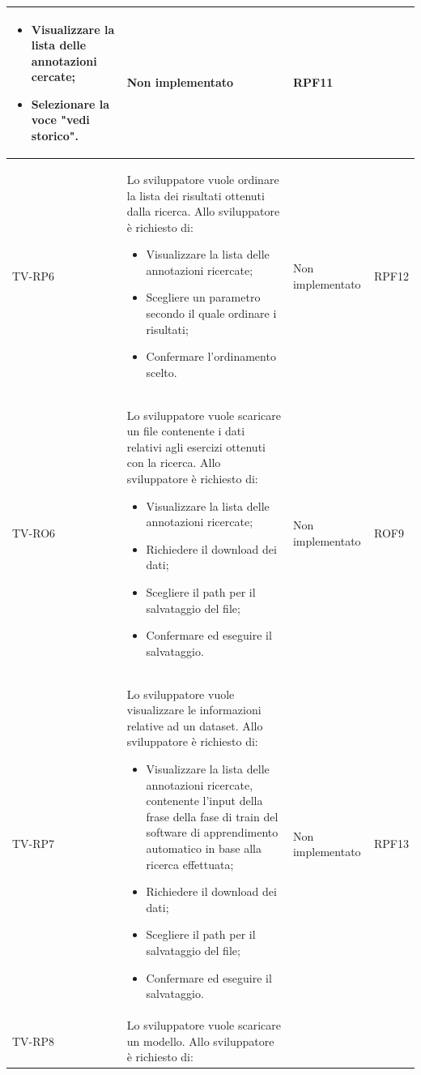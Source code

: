 \begin{longtable}{|>{\centering\arraybackslash}m{1.6cm}|>{\centering\arraybackslash}m{6.41cm}|>{\centering\arraybackslash}m{3.1cm} | >{\centering\arraybackslash}m{2.6cm}|}
		\begin{itemize}
			\item Visualizzare la lista delle annotazioni cercate;
			\item Selezionare la voce "vedi storico".
		\end{itemize}& Non implementato  & RPF11 \\ \hline
		TV-RP6 & Lo sviluppatore vuole ordinare la lista dei risultati ottenuti dalla ricerca. Allo sviluppatore è richiesto di: 
		\begin{itemize}
			\item Visualizzare la lista delle annotazioni ricercate;
			\item Scegliere un parametro secondo il quale ordinare i risultati;
			\item Confermare l'ordinamento scelto.
		\end{itemize}& Non implementato  & RPF12 \\ \hline
		  \rowcolor{LightGray}
		TV-RO6 & Lo sviluppatore vuole scaricare un file contenente i dati relativi agli esercizi ottenuti con la ricerca. Allo sviluppatore è richiesto di:
		\begin{itemize}
			\item Visualizzare la lista delle annotazioni ricercate;
			\item Richiedere il download dei dati;
			\item Scegliere il path per il salvataggio del file;
			\item Confermare ed eseguire il salvataggio.
		\end{itemize}& Non implementato  & ROF9 \\ \hline
		TV-RP7 & Lo sviluppatore vuole visualizzare le informazioni relative ad un dataset. Allo sviluppatore è richiesto di: 
		\begin{itemize}
			\item Visualizzare la lista delle annotazioni ricercate,
			contenente l'input della frase della fase di train del software di apprendimento automatico in base alla ricerca effettuata;
			\item Richiedere il download dei dati;
			\item Scegliere il path per il salvataggio del file;
			\item Confermare ed eseguire il salvataggio.
		\end{itemize}& Non implementato  & RPF13 \\ \hline
		  \rowcolor{LightGray}
		TV-RP8 & Lo sviluppatore vuole scaricare un modello. Allo sviluppatore è richiesto di:

\end{longtable}

